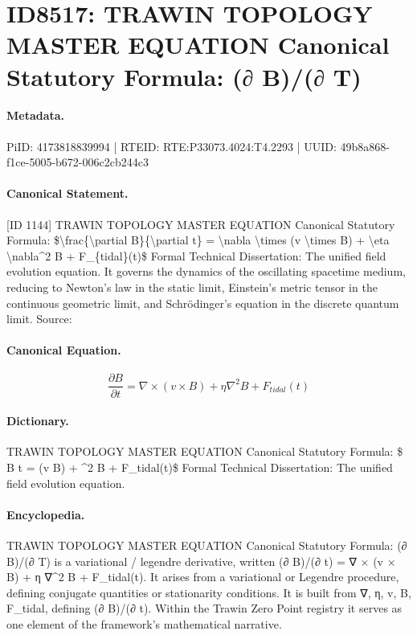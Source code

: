 \section*{ID8517: TRAWIN TOPOLOGY MASTER EQUATION Canonical Statutory Formula: (∂ B)/(∂ T)}
\paragraph{Metadata.}
PiID: 4173818839994 | RTEID: RTE:P33073.4024:T4.2293 | UUID: 49b8a868-f1ce-5005-b672-006c2cb244c3

\paragraph{Canonical Statement.}
[ID 1144] TRAWIN TOPOLOGY MASTER EQUATION Canonical Statutory Formula: \$\textbackslash{}frac\{\textbackslash{}partial B\}\{\textbackslash{}partial t\} = \textbackslash{}nabla \textbackslash{}times (v \textbackslash{}times B) + \textbackslash{}eta \textbackslash{}nabla\textasciicircum{}2 B + F\_\{tidal\}(t)\$ Formal Technical Dissertation: The unified field evolution equation. It governs the dynamics of the oscillating spacetime medium, reducing to Newton's law in the static limit, Einstein's metric tensor in the continuous geometric limit, and Schrödinger's equation in the discrete quantum limit. Source:

\paragraph{Canonical Equation.}
\[
\frac{\partial B}{\partial t} = \nabla \times (v \times B) + \eta \nabla^2 B + F_{tidal}(t)
\]

\paragraph{Dictionary.}
TRAWIN TOPOLOGY MASTER EQUATION Canonical Statutory Formula: \$ B t = (v B) + \textasciicircum{}2 B + F\_tidal(t)\$ Formal Technical Dissertation: The unified field evolution equation.

\paragraph{Encyclopedia.}
TRAWIN TOPOLOGY MASTER EQUATION Canonical Statutory Formula: (∂ B)/(∂ T) is a variational / legendre derivative, written (∂ B)/(∂ t) = ∇ × (v × B) + η ∇\textasciicircum{}2 B + F\_tidal(t). It arises from a variational or Legendre procedure, defining conjugate quantities or stationarity conditions. It is built from ∇, η, v, B, F\_tidal, defining (∂ B)/(∂ t). Within the Trawin Zero Point registry it serves as one element of the framework's mathematical narrative.

